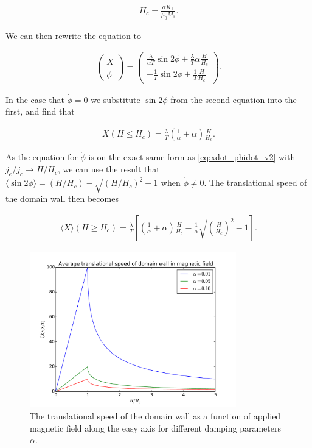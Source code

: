 \documentclass[1p]{elsarticle}		%
\numberwithin{equation}{section}
\begin{document}
\begin{align}
\label{eq:Hcrit}
H_c = \frac{\alpha K_{\perp}}{\mu_0 M_s}.
\end{align}

We can then rewrite the equation to

\begin{align}
\label{eq:xdot_phidot_hz}
\begin{pmatrix}
\dot{X} \\ \dot{\phi}
\end{pmatrix} = 
\begin{pmatrix}
\frac{\lambda}{\alpha T} \sin2\phi  + \frac{\lambda}{T} \alpha \frac{H}{H_c} \\
-\frac{1}{T}\sin2\phi + \frac{1}{T}\frac{H}{H_c}
\end{pmatrix}.
\end{align}

In the case that $\dot{\phi}=0$ we substitute $\sin2\phi$ from the second equation into the first, and find that

\begin{align}
\dot{X}(H\leq H_c) = \frac{\lambda}{T}(\frac{1}{\alpha}+\alpha) \frac{H}{H_c}.
\end{align}

As the equation for $\dot{\phi}$ is on the exact same form as \eqref{eq:xdot_phidot_v2} with $j_e/j_c \rightarrow H/H_c$, we can use the result that $\langle\sin2\phi\rangle = (H/H_c)- \sqrt{(H/H_c)^2-1}$ when $\dot{\phi} \neq 0$. The translational speed of the domain wall then becomes

\begin{align}
\langle\dot{X}\rangle (H\geq H_c) = \frac{\lambda}{T} \left[(\frac{1}{\alpha}+\alpha) \frac{H}{H_c} - \frac{1}{\alpha}\sqrt{(\frac{H}{H_c})^2-1} \right].
\end{align}

\begin{figure}[h!]
\begin{center}
\includegraphics[width=0.8\textwidth]{Figures/criticalField.pdf} 
\caption{The translational speed of the domain wall as a function of applied magnetic field along the easy axis for different damping parameters $\alpha$.}
\label{fig:criticalField} 
\end{center}
\end{figure}
\end{document}
